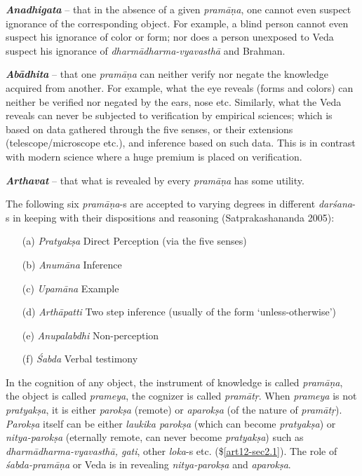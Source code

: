 {{\sl\bfseries Anadhigata}\relax} -- that in the absence of a given {\sl pramāṇa}, one cannot even suspect ignorance of the corresponding object. For example, a blind person cannot even suspect his ignorance of color or form; nor does a person unexposed to Veda suspect his ignorance of {\sl dharmādharma-vyavasthā} and Brahman.

{{\sl\bfseries Abādhita}\relax} -- that one {\sl pramāṇa} can neither verify nor negate the knowledge acquired from another. For example, what the eye reveals (forms and colors) can neither be veriﬁed nor negated by the ears, nose etc. Similarly, what the Veda reveals can never be subjected to veriﬁcation by empirical sciences; which is based on data gathered through the ﬁve senses, or their extensions (telescope/microscope etc.), and inference based on such data. This is in contrast with modern science where a huge premium is placed on veriﬁcation.

{{\sl\bfseries Arthavat}\relax} -- that what is revealed by every {\sl pramāṇa} has some utility. 

The following six {\sl pramāṇa}-s are accepted to varying degrees in different {\sl darśana}-s in keeping with their dispositions and reasoning (Satprakashananda 2005):
\begin{itemize}
\item[(a)] {\sl Pratyakṣa} Direct Perception (via the five senses)

\item[(b)] {\sl Anumāna} Inference

\item[(c)] {\sl Upamāna} Example

\item[(d)] {\sl Arthāpatti} Two step inference (usually of the form `unless-otherwise')

\item[(e)] {\sl Anupalabdhi} Non-perception

\item[(f)] {\sl Śabda} Verbal testimony
\end{itemize}

In the cognition of any object, the instrument of knowledge is called {\sl pramāṇa}, the object is called {\sl prameya}, the cognizer is called {\sl pramātṛ}. When {\sl prameya} is not {\sl pratyakṣa}, it is either {\sl parokṣa} (remote) or {\sl aparokṣa} (of the nature of {\sl pramātṛ}). {\sl Parokṣa} itself can be either {\sl laukika parokṣa} (which can become {\sl pratyakṣa}) or {\sl nitya-parokṣa} (eternally remote, can never become {\sl pratyakṣa}) such as {\sl dharmādharma-vyavasthā, gati}, other {\sl loka}-s etc. (\$\ref{art12-sec2.1}). The role of {\sl śabda-pramāṇa} or Veda is in revealing {\sl nitya-parokṣa} and {\sl aparokṣa}.

